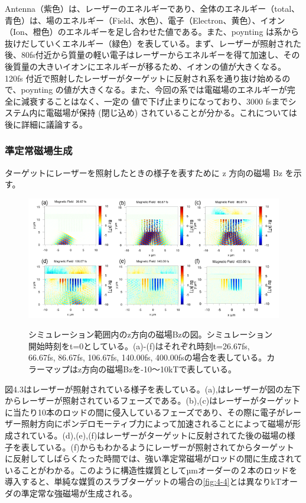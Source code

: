 \documentclass[a4paper,11pt,titlepage]{jarticle}
\numberwithin{equation}{section} %
\begin{document}
  Antenna（紫色）は、レーザーのエネルギーであり、全体のエネルギー（total、青色）は、場のエネルギー（Field、水色）、電子（Electron、黄色）、イオン（Ion、橙色）のエネルギーを足し合わせた値である。また、poynting は系から抜けだしていくエネルギー（緑色）を表している。まず、レーザーが照射された後、80fs付近から質量の軽い電子はレーザーからエネルギーを得て加速し、その後質量の大きいイオンにエネルギーが移るため、イオンの値が大きくなる。120fs 付近で照射したレーザーがターゲットに反射され系を通り抜け始めるので、poynting の値が大きくなる。また、今回の系では電磁場のエネルギーが完全に減衰することはなく、一定の
  値で下げ止まりになっており、3000 fsまでシステム内に電磁場が保持 (閉じ込め) されていることが分かる。これについては後に詳細に議論する。

  \subsubsection{準定常磁場生成}

  ターゲットにレーザーを照射したときの様子を表すために z 方向の磁場 Bz を示す。
  
  \begin{figure}[H]
    \begin{center}
      \includegraphics[scale=0.8]{./image/4-20-10rod.png}
      \label{fig:4-9}
      \caption{シミュレーション範囲内のz方向の磁場Bzの図。シミュレーション開始時刻をt=0としている。(a)-(f)はそれぞれ時刻t=26.67fs, 66.67fs, 86.67fs, 106.67fs, 140.00fs, 400.00fsの場合を表している。カラーマップはz方向の磁場Bzを-10～10kTで表している。}
    \end{center}
  \end{figure}
  図4.3はレーザーが照射されている様子を表している。(a),はレーザーが図の左下からレーザーが照射されているフェーズである。(b),(c)はレーザーがターゲットに当たり10本のロッドの間に侵入しているフェーズであり、その際に電子がレーザー照射方向にポンデロモーティブ力によって加速されることによって磁場が形成されている。(d),(e),(f)はレーザーがターゲットに反射されてた後の磁場の様子を表している。(f)からもわかるようにレーザーが照射されてからターゲットに反射してしばらくたった時間では、強い準定常磁場がロッドの間に生成されていることがわかる。このように構造性媒質としてµmオーダーの２本のロッドを導入すると、単純な媒質のスラブターゲットの場合の\ref*{fig:4-4}とは異なりkTオーダの準定常な強磁場が生成される。
  
\end{document}
